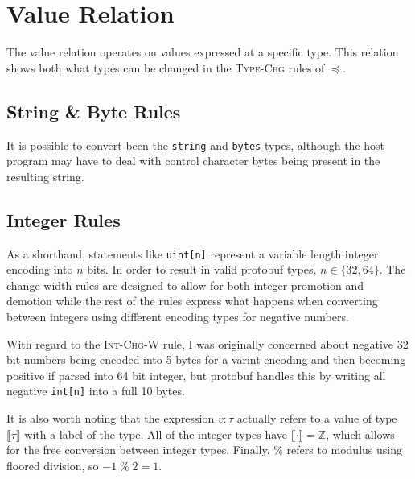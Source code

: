 \documentclass[11pt]{article}
\theoremstyle{definition}
\theoremstyle{plain}
\renewcommand{\mod}{\;\%\;}
\begin{document}
\section{Value Relation}

The value relation operates on values expressed at a specific type. This
relation shows both what types can be changed in the \textsc{Type-Chg} rules of
$\preceq$. 

\subsection{String \& Byte Rules}

It is possible to convert been the \texttt{string} and \texttt{bytes} types,
although the host program may have to deal with control character bytes being
present in the resulting string.

\begin{mathpar}

\end{mathpar}

\subsection{Integer Rules}

As a shorthand, statements like \texttt{uint[n]} represent a variable length
integer encoding into $n$ bits. In order to result in valid protobuf types, $n \in
\{32, 64\}$. The change width rules are designed to allow for both integer
promotion and demotion while the rest of the rules express what happens when
converting between integers using different encoding types for negative numbers.

With regard to the \textsc{Int-Chg-W} rule, I was originally concerned about
negative 32 bit numbers being encoded into 5 bytes for a varint encoding and
then becoming positive if parsed into 64 bit integer, but protobuf handles this
by writing all negative \texttt{int[n]} into a full 10 bytes. 

It is also worth noting that the expression $v : \tau$ actually refers to a value
of type $\llbracket \tau \rrbracket$ with a label of the type. All of the integer
types have $\llbracket \cdot \rrbracket = \mathbb{Z}$, which allows for the free conversion
between integer types. Finally, $\%$ refers to modulus using floored division,
so $-1 \mod 2 = 1$. 
\end{document}
